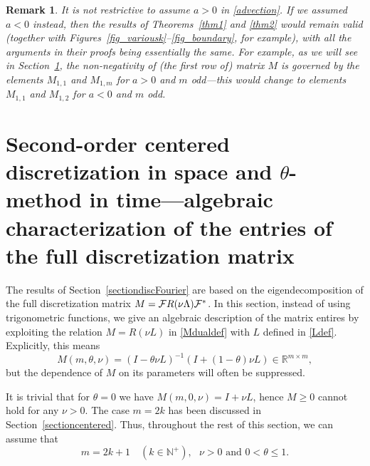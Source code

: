 \documentclass[smallextended,numbook,runningheads]{svjour3}     %
\newtheorem{remark}{Remark}
\newtheorem{remark}{Remark}
\newcommand{\te}{\theta}
\newcommand{\nplus}{\mathbb{N}^+}
\newcommand{\cF}{{\cal{F}}}
\begin{document}
\begin{remark}
It is not restrictive to assume $a>0$ in \eqref{advection}. If we assumed $a<0$ instead, then the results of Theorems~\ref{thm1} and \ref{thm2} would remain valid (together with Figures~\ref{fig_variousk}--\ref{fig_boundary}, for example), with all the arguments in their proofs being essentially the same.  For example, as we will see in Section~\ref{section3}, the non-negativity of (the first row of) matrix $M$ is governed by the elements $M_{1,1}$ and $M_{1,m}$ for $a>0$ and $m$ odd---this would change to elements $M_{1,1}$ and $M_{1,2}$ for $a<0$ and $m$ odd.
\end{remark}






\section{Second-order centered discretization in space and \texorpdfstring{$\theta$}{}-method in time---algebraic characterization of the entries of the full discretization matrix}\label{section3}

The results of Section~\ref{sectiondiscFourier} are based on the eigendecomposition of the full discretization matrix $M=\cF R(\nu \Lambda) \cF^*$. In this section, instead of using trigonometric functions, we give an algebraic description of the matrix entires by exploiting the relation $M=R(\nu L)$ in \eqref{Mdualdef} with $L$ defined in \eqref{Ldef}.
Explicitly, this means 
\begin{equation}\label{Mdef}
M(m,\te,\nu)=(I-\te\nu L)^{-1}(I+(1-\te)\nu L)\in\mathbb{R}^{m\times m},
\end{equation}
but the dependence of $M$ on its parameters will often be suppressed. 

It is trivial that for $\te=0$ we have $M(m,0,\nu)=I+\nu L$, hence $M\ge 0$ cannot hold for any $\nu>0$. The case $m=2k$ has been discussed in Section~\ref{sectioncentered}. Thus, throughout the rest of this section, we can assume that
\begin{equation}\label{genassump}
\boxed{ 
m=2k+1\quad (k\in\nplus), \ \ \ \nu>0 \text{\ \  and\ \  } 0<\te\le 1.}
\end{equation}
\end{document}
